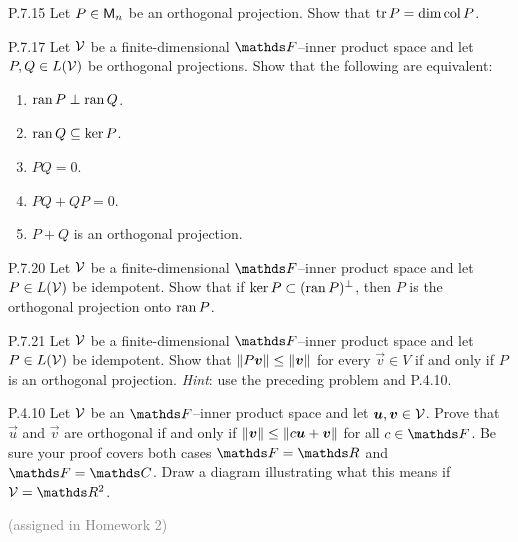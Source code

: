 \documentclass{../homework}
\date{Tuesday 2/26}
\author{}
\begin{document}
\begin{problems}
\item[P.7.15] Let \(P \in \mathsf{M}_n\) be an orthogonal projection.  Show
  that \(\operatorname{tr} P = \dim \operatorname{col} P\).

  \begin{solution}

  \end{solution}

\item[P.7.17] Let \(\mathcal{V}\) be a finite-dimensional \(\FF\)--inner
  product space and let \(P, Q \in L(\mathcal{V})\) be orthogonal
  projections.  Show that the following are equivalent:
  \begin{enumerate}
  \item \(\operatorname{ran} P \perp \operatorname{ran} Q\).
  \item \(\operatorname{ran} Q \subseteq \ker P\).
  \item \(PQ = 0\).
  \item \(PQ + QP = 0\).
  \item \(P+Q\) is an orthogonal projection.
  \end{enumerate}

  \begin{solution}

  \end{solution}

\item[P.7.20] Let \(\mathcal{V}\) be a finite-dimensional \(\FF\)--inner
  product space and let \(P \in L(\mathcal{V})\) be idempotent.  Show that
  if \(\ker P \subset (\operatorname{ran} P)^\perp\), then \(P\) is the orthogonal
  projection onto \(\operatorname{ran} P\).

  \begin{solution}

  \end{solution}

\item[P.7.21] Let \(\mathcal{V}\) be a finite-dimensional \(\FF\)--inner
  product space and let \(P \in L(\mathcal{V})\) be idempotent.  Show that
  \(\norm{P \vec v} \le \norm{\vec v}\) for every \(\vec v \in V\) if
  and only if \(P\) is an orthogonal projection.  \textit{Hint}: use
  the preceding problem and P.4.10.
  \begin{book}
    \begin{problems}
    \item[P.4.10] Let \(\mathcal{V}\) be an \(\FF\)--inner product space
      and let \(\vec u, \vec v \in \Vspace\).  Prove that \(\vec u\)
      and \(\vec v\) are orthogonal if and only if
      \(\norm{\vec v} \le \norm{c \vec u + \vec v}\) for all
      \(c \in \FF\).  Be sure your proof covers both cases
      \(\FF = \RR\) and \(\FF = \CC\).  Draw a diagram illustrating
      what this means if \(\Vspace = \RR^2\).
    \end{problems}
    \begin{center}
      \textcolor{gray}{(assigned in Homework 2)}
    \end{center}
  \end{book}


\end{problems}
\end{document}
